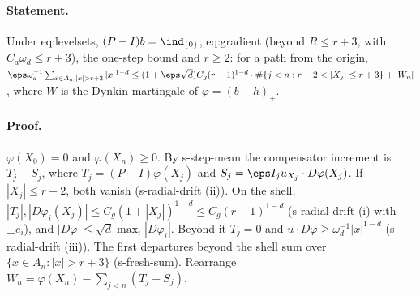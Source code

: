 \paragraph{Statement.} Under eq:levelsets, $(P-I)b=\ind_{\{0\}}$, eq:gradient (beyond $R\leq r+3$, with $C_a\omega_d\leq r+3$), the one-step bound and
$r\geq2$: for a path from the origin, $\eps\omega_d^{-1}\sum_{x\in A_n,|x|>r+3}|x|^{1-d}\leq(1+\eps\sqrt d)C_g(r-1)^{1-d}\cdot\#\{j<n:r-2<|X_j|\leq r+3\}+|W_n|$,
where $W$ is the Dynkin martingale of $\varphi=(b-h)_+$.
\paragraph{Proof.} $\varphi(X_0)=0$ and $\varphi(X_n)\geq0$. By s-step-mean the compensator increment is
$T_j-S_j$, where $T_j=(P-I)\varphi(X_j)$ and $S_j=\eps I_ju_{X_j}\cdot D\varphi(X_j)$. If $|X_j|\leq r-2$, both vanish (s-radial-drift (ii)). On
the shell, $|T_j|,|D\varphi_i(X_j)|\leq C_g(1+|X_j|)^{1-d}\leq C_g(r-1)^{1-d}$ (s-radial-drift (i) with $\pm e_i$), and
$|D\varphi|\leq\sqrt d\max_i|D\varphi_i|$. Beyond it $T_j=0$ and $u\cdot D\varphi\geq\omega_d^{-1}|x|^{1-d}$ (s-radial-drift (iii)). The first
departures beyond the shell sum over $\{x\in A_n:|x|>r+3\}$ (s-fresh-sum). Rearrange $W_n=\varphi(X_n)-\sum_{j<n}(T_j-S_j)$.
